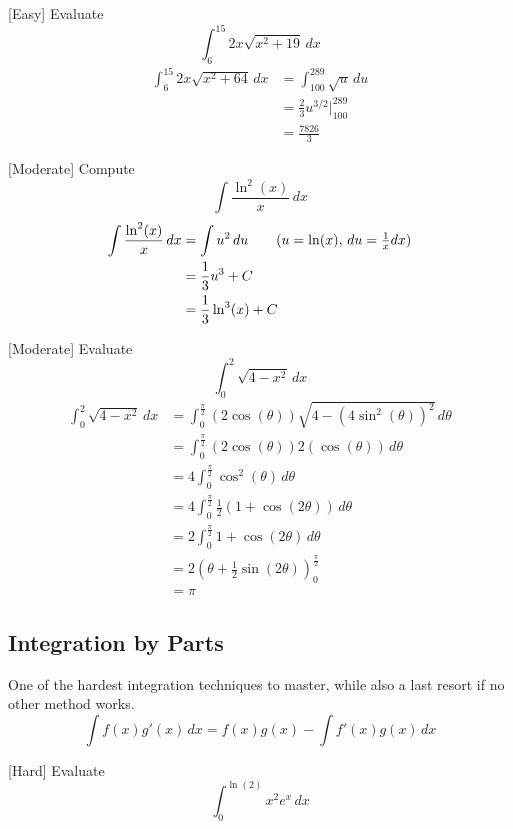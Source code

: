 \documentclass[a4paper]{article}
\begin{document}
\begin{eg}{[Easy]}{} Evaluate $$\int_6^{15} 2x\sqrt{x^2+19}\,dx$$ \tcbline
\begin{align*} 
\int_6^{15} 2x\sqrt{x^2+64}\,dx&=\int_{100}^{289}\sqrt{u}\,du\tag{$u=x^2+64$, $du=2xdx$}\\
&=\frac{2}{3}u^{3/2}\bigg\vert_{100}^{289}\\
&=\frac{7826}{3}
\end{align*}
\end{eg}

\begin{eg}{[Moderate]}{} Compute $$\int \frac{\ln^2(x)}{x}\,dx$$ \tcbline
\begin{align*}
\int\frac{\ln^2(x)}{x}\,dx&=\int u^2\,du\tag{$u=\ln(x)$, $du=\frac{1}{x}dx$}\\
&=\frac{1}{3}u^3+C\\
&=\frac{1}{3}\ln^3(x)+C
\end{align*}
\end{eg}

\begin{eg}{[Moderate]}{} Evaluate $$\int_0^2 \sqrt{4-x^2}\,dx$$ \tcbline
\begin{align*}
\int_0^2 \sqrt{4-x^2}\,dx&=\int_0^{\frac{\pi}{2}} (2\cos(\theta))\sqrt{4-(4\sin^2(\theta))^2}\,d\theta\tag{$x=2\sin(\theta)$, $dx=2\cos(\theta)d\theta$}\\
&=\int_0^{\frac{\pi}{2}} (2\cos(\theta))2(\cos(\theta))\,d\theta\\
&=4\int_0^{\frac{\pi}{2}} \cos^2(\theta)\,d\theta\\
&=4\int_0^{\frac{\pi}{2}} \frac{1}{2}(1+\cos(2\theta))\,d\theta\\
&=2\int_0^{\frac{\pi}{2}} 1+\cos(2\theta)\,d\theta\\
&=2\left(\theta+\frac{1}{2}\sin(2\theta)\right)_0^{\frac{\pi}{2}}\\
&=\pi
\end{align*}
\end{eg}

\subsection{Integration by Parts}
One of the hardest integration techniques to master, while also a last resort if no other method works. $$\int f(x)g'(x)\,dx= f(x)g(x)-\int f'(x)g(x)\,dx$$

\begin{eg}{}{}[Hard] Evaluate $$\int_0^{\ln(2)} x^2e^x\,dx$$
\end{eg}
\end{document}
